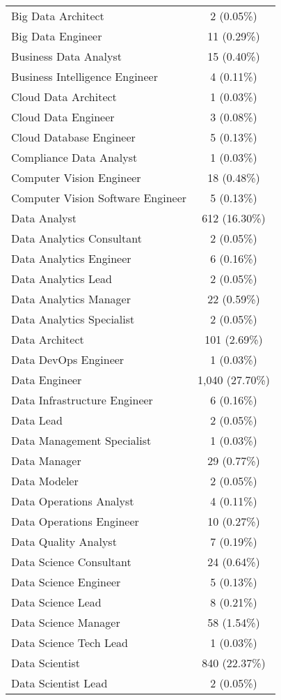 \documentclass[
]{article}
\begin{document}
\begin{longtable}[]{@{}lc@{}}
Big Data Architect & 2 (0.05\%) \\
Big Data Engineer & 11 (0.29\%) \\
Business Data Analyst & 15 (0.40\%) \\
Business Intelligence Engineer & 4 (0.11\%) \\
Cloud Data Architect & 1 (0.03\%) \\
Cloud Data Engineer & 3 (0.08\%) \\
Cloud Database Engineer & 5 (0.13\%) \\
Compliance Data Analyst & 1 (0.03\%) \\
Computer Vision Engineer & 18 (0.48\%) \\
Computer Vision Software Engineer & 5 (0.13\%) \\
Data Analyst & 612 (16.30\%) \\
Data Analytics Consultant & 2 (0.05\%) \\
Data Analytics Engineer & 6 (0.16\%) \\
Data Analytics Lead & 2 (0.05\%) \\
Data Analytics Manager & 22 (0.59\%) \\
Data Analytics Specialist & 2 (0.05\%) \\
Data Architect & 101 (2.69\%) \\
Data DevOps Engineer & 1 (0.03\%) \\
Data Engineer & 1,040 (27.70\%) \\
Data Infrastructure Engineer & 6 (0.16\%) \\
Data Lead & 2 (0.05\%) \\
Data Management Specialist & 1 (0.03\%) \\
Data Manager & 29 (0.77\%) \\
Data Modeler & 2 (0.05\%) \\
Data Operations Analyst & 4 (0.11\%) \\
Data Operations Engineer & 10 (0.27\%) \\
Data Quality Analyst & 7 (0.19\%) \\
Data Science Consultant & 24 (0.64\%) \\
Data Science Engineer & 5 (0.13\%) \\
Data Science Lead & 8 (0.21\%) \\
Data Science Manager & 58 (1.54\%) \\
Data Science Tech Lead & 1 (0.03\%) \\
Data Scientist & 840 (22.37\%) \\
Data Scientist Lead & 2 (0.05\%) \\

\end{longtable}
\end{document}
